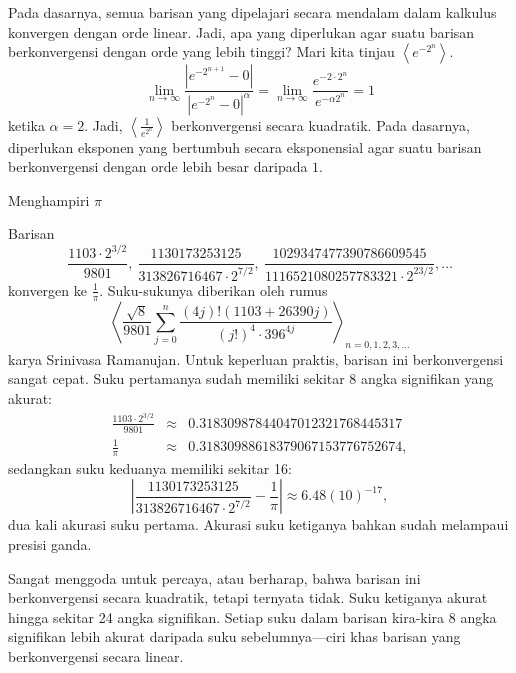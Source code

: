 Pada dasarnya, semua barisan yang dipelajari secara mendalam dalam
kalkulus konvergen dengan orde linear. Jadi, apa yang diperlukan agar
suatu barisan berkonvergensi dengan orde yang lebih tinggi? Mari kita
tinjau $\left\langle e^{-2^{n}}\right\rangle $. 
\[
\lim_{n\to\infty}\frac{|e^{-2^{n+1}}-0|}{|e^{-2^{n}}-0|^{\alpha}}=\lim_{n\to\infty}\frac{e^{-2\cdot2^{n}}}{e^{-\alpha2^{n}}}=1
\]
ketika $\alpha=2$. Jadi, $\left\langle \frac{1}{e^{2^{n}}}\right\rangle $
berkonvergensi secara kuadratik. Pada dasarnya, diperlukan eksponen
yang bertumbuh secara eksponensial agar suatu barisan berkonvergensi
dengan orde lebih besar daripada $1$.

\begin{digression}{Menghampiri $\pi$} 

\noindent Barisan 
\[
\frac{1103\cdot2^{3/2}}{9801},\ \frac{1130173253125}{313826716467\cdot2^{7/2}},\ \frac{1029347477390786609545}{1116521080257783321\cdot2^{23/2}},\ldots
\]
konvergen ke $\frac{1}{\pi}$. Suku-sukunya diberikan oleh rumus 
\[
\left\langle \frac{\sqrt{8}}{9801}\sum_{j=0}^{n}\frac{(4j)!(1103+26390j)}{(j!)^{4}\cdot396^{4j}}\right\rangle _{n=0,1,2,3,\ldots}
\]
karya Srinivasa Ramanujan. Untuk keperluan
praktis, barisan ini berkonvergensi sangat cepat. Suku pertamanya
sudah memiliki sekitar 8 angka signifikan yang akurat:
\begin{eqnarray*}
\frac{1103\cdot2^{3/2}}{9801} & \approx & 0.31830987844047012321768445317\\
\frac{1}{\pi} & \approx & 0.31830988618379067153776752674,
\end{eqnarray*}
sedangkan suku keduanya memiliki sekitar 16:
\[
\left|\frac{1130173253125}{313826716467\cdot2^{7/2}}-\frac{1}{\pi}\right|\approx6.48(10)^{-17},
\]
dua kali akurasi suku pertama. Akurasi suku ketiganya bahkan sudah
melampaui presisi ganda. 

Sangat menggoda untuk percaya, atau berharap, bahwa barisan ini berkonvergensi
secara kuadratik, tetapi ternyata tidak. Suku ketiganya akurat hingga
sekitar 24 angka signifikan. Setiap suku dalam barisan kira-kira 8
angka signifikan lebih akurat daripada suku sebelumnya---ciri khas
barisan yang berkonvergensi secara linear. 

\end{digression}


